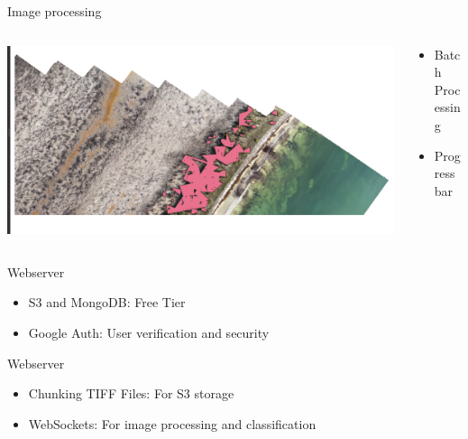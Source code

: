 \begin{frame}{Image processing}
    \begin{columns}
        \begin{column}{0.5\textwidth}
            \includegraphics[height=0.7\textheight,keepaspectratio]{images/mm_classified.png}
        \end{column}
        \begin{column}{0.5\textwidth}
            \begin{itemize}
                \item Batch Processing
                \item Progressbar
            \end{itemize}
        \end{column}
    \end{columns}
\end{frame}

\begin{frame}{Webserver}
    \begin{itemize}
        \item S3 and MongoDB: Free Tier
        \item Google Auth: User verification and security
    \end{itemize}    
\end{frame}

\begin{frame}{Webserver}
    \begin{itemize}
        \item Chunking TIFF Files: For S3 storage
        \item WebSockets: For image processing and classification
    \end{itemize}    
\end{frame}

